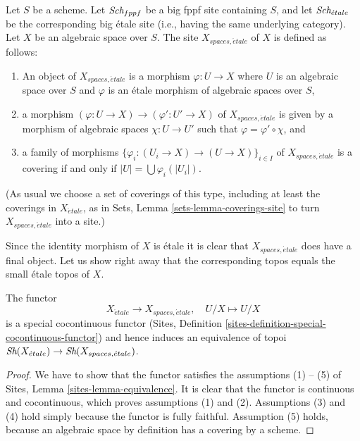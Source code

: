 \begin{definition}
\label{definition-spaces-etale-site}
Let $S$ be a scheme.
Let $\textit{Sch}_{fppf}$ be a big fppf site containing $S$,
and let $\textit{Sch}_{\acute{e}tale}$ be the corresponding big \'etale site
(i.e., having the same underlying category).
Let $X$ be an algebraic space over $S$.
The site {\it $X_{spaces, \acute{e}tale}$} of $X$ is defined as follows:
\begin{enumerate}
\item An object of $X_{spaces, \acute{e}tale}$ is a morphism
$\varphi : U \to X$ where $U$ is an algebraic space over $S$ and
$\varphi$ is an \'etale morphism of algebraic spaces over $S$,
\item a morphism $(\varphi : U \to X) \to (\varphi' : U' \to X)$ of
$X_{spaces, \acute{e}tale}$ is given by a morphism of algebraic spaces
$\chi : U \to U'$ such that $\varphi = \varphi' \circ \chi$, and
\item a family of morphisms
$\{\varphi_i : (U_i \to X) \to (U \to X)\}_{i \in I}$
of $X_{spaces, \acute{e}tale}$ is a covering if and only if
$|U| = \bigcup \varphi_i(|U_i|)$.
\end{enumerate}
(As usual we choose a set of coverings of this type, including at least
the coverings in $X_{\acute{e}tale}$, as in
Sets, Lemma \ref{sets-lemma-coverings-site}
to turn $X_{spaces, \acute{e}tale}$ into a site.)
\end{definition}

\noindent
Since the identity morphism of $X$ is \'etale it is clear that
$X_{spaces, \acute{e}tale}$ does have a final object.
Let us show right away that the corresponding topos equals the
small \'etale topos of $X$.

\begin{lemma}
\label{lemma-compare-etale-sites}
The functor
$$
X_{\acute{e}tale} \longrightarrow X_{spaces, \acute{e}tale}, \quad
U/X \longmapsto U/X
$$
is a special cocontinuous functor
(Sites, Definition \ref{sites-definition-special-cocontinuous-functor})
and hence induces an equivalence of topoi
$\mathop{\textit{Sh}}\nolimits(X_{\acute{e}tale}) \to \mathop{\textit{Sh}}\nolimits(X_{spaces, \acute{e}tale})$.
\end{lemma}

\begin{proof}
We have to show that the functor satisfies the assumptions (1) -- (5) of
Sites, Lemma \ref{sites-lemma-equivalence}.
It is clear that the functor is continuous and cocontinuous, which
proves assumptions (1) and (2).
Assumptions (3) and (4) hold simply because the functor is fully faithful.
Assumption (5) holds, because an algebraic space by definition has
a covering by a scheme.
\end{proof}

